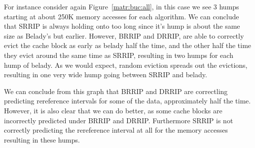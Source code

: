 For instance consider again Figure~\ref{matr:buc:all}, in this case we see 3 humps starting at about 250K memory accesses for each algorithm.
We can conclude that SRRIP is always holding onto too long since it's hump is about the same size as Belady's but earlier.
However, BRRIP and DRRIP, are able to correctly evict the cache block as early as belady half the time,
 and the other half the time they evict around the same time as SRRIP, resulting in two humps for each hump of belady.
As we would expect, random eviction spreads out the evictions, resulting in one very wide hump going between SRRIP and belady.

We can conclude from this graph that BRRIP and DRRIP are correctling predicting rereference intervals for some of the data, approximately half the time.
However, it is also clear that we can do better, as some cache blocks are incorrectly predicted under BRRIP and DRRIP.
Furthermore SRRIP is not correctly predicting the rereference interval at all for the memory accesses resulting in these humps.

